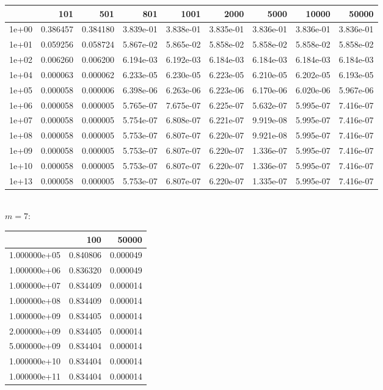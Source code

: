 \documentclass[11pt,a4paper]{report}
\begin{document}
\begin{tabular}{lrrrrrrrr}
\toprule
{} &     101   &     501   &         801   &         1001  &         2000  &         5000  &         10000 &         50000 \\
\midrule
1e+00 &  0.386457 &  0.384180 &  3.839e-01 &  3.838e-01 &  3.835e-01 &  3.836e-01 &  3.836e-01 &  3.836e-01 \\
1e+01 &  0.059256 &  0.058724 &  5.867e-02 &  5.865e-02 &  5.858e-02 &  5.858e-02 &  5.858e-02 &  5.858e-02 \\
1e+02 &  0.006260 &  0.006200 &  6.194e-03 &  6.192e-03 &  6.184e-03 &  6.184e-03 &  6.184e-03 &  6.184e-03 \\
1e+04 &  0.000063 &  0.000062 &  6.233e-05 &  6.230e-05 &  6.223e-05 &  6.210e-05 &  6.202e-05 &  6.193e-05 \\
1e+05 &  0.000058 &  0.000006 &  6.398e-06 &  6.263e-06 &  6.223e-06 &  6.170e-06 &  6.020e-06 &  5.967e-06 \\
1e+06 &  0.000058 &  0.000005 &  5.765e-07 &  7.675e-07 &  6.225e-07 &  5.632e-07 &  5.995e-07 &  7.416e-07 \\
1e+07 &  0.000058 &  0.000005 &  5.754e-07 &  6.808e-07 &  6.221e-07 &  9.919e-08 &  5.995e-07 &  7.416e-07 \\
1e+08 &  0.000058 &  0.000005 &  5.753e-07 &  6.807e-07 &  6.220e-07 &  9.921e-08 &  5.995e-07 &  7.416e-07 \\
1e+09 &  0.000058 &  0.000005 &  5.753e-07 &  6.807e-07 &  6.220e-07 &  1.336e-07 &  5.995e-07 &  7.416e-07 \\
1e+10 &  0.000058 &  0.000005 &  5.753e-07 &  6.807e-07 &  6.220e-07 &  1.336e-07 &  5.995e-07 &  7.416e-07 \\
1e+13 &  0.000058 &  0.000005 &  5.753e-07 &  6.807e-07 &  6.220e-07 &  1.335e-07 &  5.995e-07 &  7.416e-07 \\
\bottomrule
\end{tabular}
\\
$m=7$:
\\
\begin{tabular}{lrr}
\toprule
{} &     100   &     50000 \\
\midrule
1.000000e+05 &  0.840806 &  0.000049 \\
1.000000e+06 &  0.836320 &  0.000049 \\
1.000000e+07 &  0.834409 &  0.000014 \\
1.000000e+08 &  0.834409 &  0.000014 \\
1.000000e+09 &  0.834405 &  0.000014 \\
2.000000e+09 &  0.834405 &  0.000014 \\
5.000000e+09 &  0.834404 &  0.000014 \\
1.000000e+10 &  0.834404 &  0.000014 \\
1.000000e+11 &  0.834404 &  0.000014 \\
\bottomrule
\end{tabular}
\end{document}
